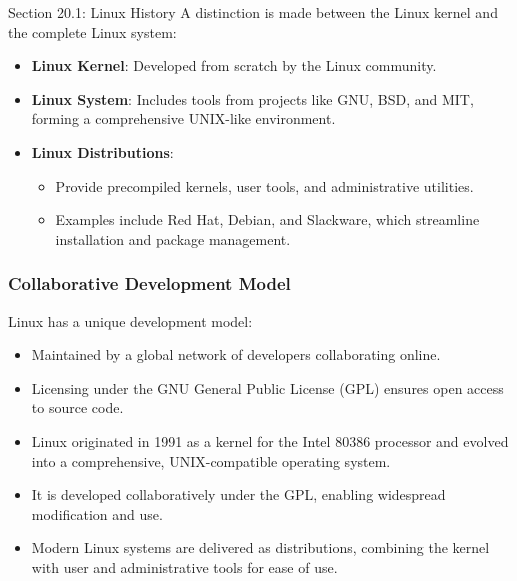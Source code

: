 \begin{notes}{Section 20.1: Linux History}
    A distinction is made between the Linux kernel and the complete Linux system:
    \begin{itemize}
        \item \textbf{Linux Kernel}: Developed from scratch by the Linux community.
        \item \textbf{Linux System}: Includes tools from projects like GNU, BSD, and MIT, forming a comprehensive UNIX-like environment.
        \item \textbf{Linux Distributions}:
        \begin{itemize}
            \item Provide precompiled kernels, user tools, and administrative utilities.
            \item Examples include Red Hat, Debian, and Slackware, which streamline installation and package management.
        \end{itemize}
    \end{itemize}
    
    \subsubsection*{Collaborative Development Model}
    
    Linux has a unique development model:
    \begin{itemize}
        \item Maintained by a global network of developers collaborating online.
        \item Licensing under the GNU General Public License (GPL) ensures open access to source code.
    \end{itemize}
    
    \begin{highlight}
        \begin{itemize}
            \item Linux originated in 1991 as a kernel for the Intel 80386 processor and evolved into a comprehensive, UNIX-compatible operating system.
            \item It is developed collaboratively under the GPL, enabling widespread modification and use.
            \item Modern Linux systems are delivered as distributions, combining the kernel with user and administrative tools for ease of use.
        \end{itemize}
    \end{highlight}
\end{notes}

